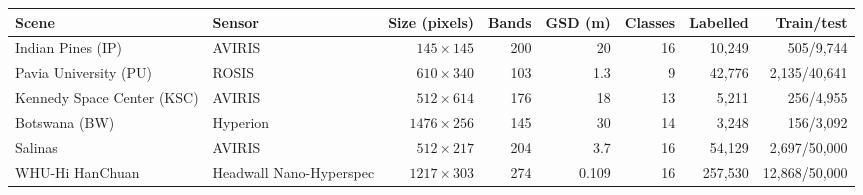 \begin{tabular}{llrrrrrr}
\toprule
Scene & Sensor & Size (pixels) & Bands & GSD (m) & Classes & Labelled & Train/test \\
\midrule
Indian Pines (IP) & AVIRIS & $145\times145$ & 200 & 20 & 16 & 10,249 & 505/9,744 \\
Pavia University (PU) & ROSIS & $610\times340$ & 103 & 1.3 & 9 & 42,776 & 2,135/40,641 \\
Kennedy Space Center (KSC) & AVIRIS & $512\times614$ & 176 & 18 & 13 & 5,211 & 256/4,955 \\
Botswana (BW) & Hyperion & $1476\times256$ & 145 & 30 & 14 & 3,248 & 156/3,092 \\
Salinas & AVIRIS & $512\times217$ & 204 & 3.7 & 16 & 54,129 & 2,697/50,000 \\
WHU-Hi HanChuan & Headwall Nano-Hyperspec & $1217\times303$ & 274 & 0.109 & 16 & 257,530 & 12,868/50,000 \\
\bottomrule
\end{tabular}
